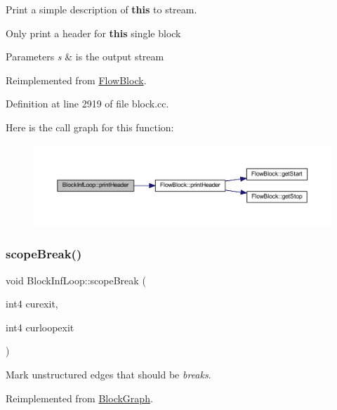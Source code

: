 Print a simple description of {\bfseries{this}} to stream. 

Only print a header for {\bfseries{this}} single block 
\begin{DoxyParams}{Parameters}
{\em s} & is the output stream \\
\hline
\end{DoxyParams}


Reimplemented from \mbox{\hyperlink{class_flow_block_a0d19c5b80186cf289dfbe0ce9e3ce37a}{Flow\+Block}}.



Definition at line 2919 of file block.\+cc.

Here is the call graph for this function\+:
\nopagebreak
\begin{figure}[H]
\begin{center}
\leavevmode
\includegraphics[width=350pt]{class_block_inf_loop_a52090deeaa2673ea5afedca0331d3027_cgraph}
\end{center}
\end{figure}
\mbox{\label{class_block_inf_loop_ad1f92e4b37d7bf19cc409d353ad281ae}} 
\subsubsection{\texorpdfstring{scopeBreak()}{scopeBreak()}}
{\footnotesize\ttfamily void Block\+Inf\+Loop\+::scope\+Break (\begin{DoxyParamCaption}\item[{int4}]{curexit,  }\item[{int4}]{curloopexit }\end{DoxyParamCaption})\hspace{0.3cm}{\ttfamily [virtual]}}



Mark unstructured edges that should be {\itshape breaks}. 



Reimplemented from \mbox{\hyperlink{class_block_graph_a55618dfd49266bd4185d119f08e8b630}{Block\+Graph}}.



